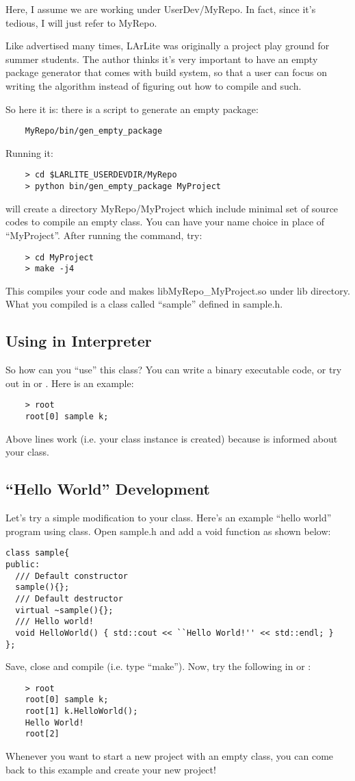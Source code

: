 Here, I assume we are working under {\ttfamily UserDev/MyRepo}. In fact, since it's tedious, I will just refer to {\ttfamily MyRepo}.

Like advertised many times, LArLite was originally a \CPP project play ground for summer students. The author thinks it's very important to have an empty \CPP package generator that comes with build system, so that a user can focus on writing the algorithm instead of figuring out how to compile and such.

So here it is: there is a \python script to generate an empty \CPP package:
\begin{lstlisting}
    MyRepo/bin/gen_empty_package
\end{lstlisting}
Running it:
\begin{lstlisting}
    > cd $LARLITE_USERDEVDIR/MyRepo
    > python bin/gen_empty_package MyProject
\end{lstlisting}
will create a directory {\ttfamily MyRepo/MyProject} which include minimal set of source codes to compile an empty \CPP class. You can have your name choice in place of ``MyProject''. After running the command, try:
\begin{lstlisting}
    > cd MyProject
    > make -j4
\end{lstlisting}
This compiles your code and makes {\ttfamily libMyRepo\_MyProject.so} under {\ttfamily lib} directory.
What you compiled is a \CPP class called ``sample'' defined in {\ttfamily sample.h}. 

\subsection{Using in Interpreter}

So how can you ``use'' this \CPP class? You can write a binary executable code, or try out in \CINT or \PyROOT. Here is an example:
\begin{lstlisting}
    > root
    root[0] sample k;
\end{lstlisting}
Above lines work (i.e. your class instance is created) because \CINT is informed about your class. 

\subsection{``Hello World'' Development}
\label{sec:helloworld}
Let's try a simple modification to your class. Here's an example ``hello world'' program using \CPP class. Open {\ttfamily sample.h} and add a {\ttfamily void} function as shown below:
\begin{lstlisting}
class sample{
public:
  /// Default constructor
  sample(){};
  /// Default destructor
  virtual ~sample(){};
  /// Hello world!
  void HelloWorld() { std::cout << ``Hello World!'' << std::endl; }
};
\end{lstlisting}
Save, close and compile (i.e. type ``make''). Now, try the following in \CINT or \PyROOT:
\begin{lstlisting}
    > root
    root[0] sample k;
    root[1] k.HelloWorld();
    Hello World!
    root[2]
\end{lstlisting}

Whenever you want to start a new project with an empty class, you can come back to this example and create your new \CPP project!



